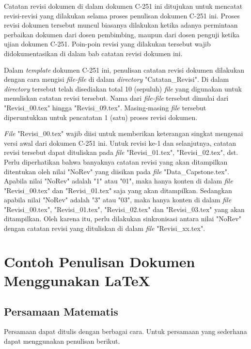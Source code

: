     Catatan revisi dokumen di dalam dokumen C-251 ini ditujukan untuk mencatat revisi-revisi yang dilakukan selama proses penulisan dokumen C-251 ini. Proses revisi dokumen tersebut muncul biasanya dilakukan ketika adanya permintaan perbaikan dokumen dari dosen pembimbing, maupun dari dosen penguji ketika ujian dokumen C-251. Poin-poin revisi yang dilakukan tersebut wajib didokumentasikan di dalam bab catatan revisi dokumen ini.
    
    Dalam \textit{template} dokumen C-251 ini, penulisan catatan revisi dokumen dilakukan dengan cara mengisi \textit{file-file} di dalam \textit{directory} "Catatan\_Revisi". Di dalam \textit{directory} tersebut telah disediakan total 10 (sepuluh) \textit{file} yang digunakan untuk menuliskan catatan revisi tersebut. Nama dari \textit{file-file} tersebut dimulai dari "Revisi\_00.tex" hingga "Revisi\_09.tex". Masing-masing \textit{file} tersebut diperuntukkan untuk pencatatan 1 (satu) proses revisi dokumen. 
    
    \textit{File} "Revisi\_00.tex" wajib diisi untuk memberikan keterangan singkat mengenai versi awal dari dokumen C-251 ini. Untuk revisi ke-1 dan selanjutnya, catatan revisi tersebut dapat dituliskan pada \textit{file} "Revisi\_01.tex", "Revisi\_02.tex", dst. Perlu diperhatikan bahwa banyaknya catatan revisi yang akan ditampilkan ditentukan oleh nilai "NoRev" yang diisikan pada \textit{file} "Data\_Capstone.tex". Apabila nilai "NoRev" adalah "1" atau "01", maka hanya konten di dalam \textit{file} "Revisi\_00.tex" dan "Revisi\_01.tex" saja yang akan ditampilkan. Sedangkan apabila nilai "NoRev" adalah "3" atau "03", maka hanya konten di dalam \textit{file} "Revisi\_00.tex", "Revisi\_01.tex", "Revisi\_02.tex" dan "Revisi\_03.tex" yang akan ditampilkan. Oleh karena itu, perlu dilakukan sinkronisasi antara nilai "NoRev" dengan catatan revisi yang dituliskan di dalam \textit{file} "Revisi\_xx.tex".
    
\section{Contoh Penulisan Dokumen Menggunakan \LaTeX}
\label{sec:Contoh_Penulisan_Dokumen_Menggunakan_LaTeX}

    \subsection{Persamaan Matematis}
    \label{subsec:pers_mat}
    
        Persamaan dapat ditulis dengan berbagai cara. Untuk persamaan yang sederhana dapat menggunakan penulisan berikut.
        
